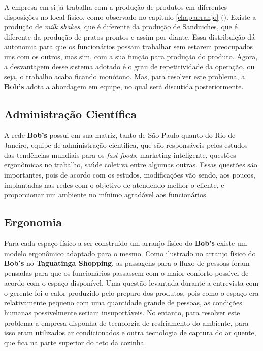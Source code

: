 			A empresa em si já trabalha com a produção de produtos em diferentes disposições no local físico, como observado no capitulo \ref{chap:arranjo} (). Existe a produção de \emph{milk shakes}, que é diferente da produção de Sanduiches, que é diferente da produção de pratos prontos e assim por diante. Essa distribuição dá autonomia para que os funcionários possam trabalhar sem estarem preocupados uns com os outros, mas sim, com a sua função para produção do produto. Agora, a desvantagem desse sistema adotado é o grau de repetitividade da operação, ou seja, o trabalho acaba ficando monótono. Mas, para resolver este problema, a \textbf{Bob’s} adota a abordagem em equipe, no qual será discutida posteriormente.

		\subsection[Administração Científica]{Administração Científica}
		\label{sec:organizacao_ac}

			A rede \textbf{Bob’s} possui em sua matriz, tanto de São Paulo quanto do Rio de Janeiro, equipe de administração cientifica, que são responsáveis pelos estudos das tendências mundiais para os \emph{fast foods}, marketing inteligente, questões ergonômicas no trabalho, saúde coletiva entre algumas outras. Essas questões são importantes, pois de acordo com os estudos, modificações vão sendo, aos poucos, implantadas nas redes com o objetivo de atendendo melhor o cliente, e proporcionar um ambiente no mínimo agradável aos funcionários. \cite{osman}

		\subsection[Ergonomia]{Ergonomia}
		\label{sec:organizacao_ergonomia}

			Para cada espaço físico a ser construído um arranjo físico do \textbf{Bob’s} existe um modelo ergonômico adaptado para o mesmo. Como ilustrado no arranjo físico do \textbf{Bob’s} no \textbf{Taguatinga Shopping}, as passagens para o fluxo de pessoas foram pensadas para que os funcionários passassem com o maior conforto possível de acordo com o espaço disponível. Uma questão levantada durante a entrevista com o gerente foi o calor produzido pelo preparo dos produtos, pois como o espaço era relativamente pequeno com uma quantidade grande de pessoas, as condições humanas possivelmente seriam insuportáveis. No entanto, para resolver este problema a empresa disponha de tecnologia de resfriamento do ambiente, para isso eram utilizados ar condicionados e outra tecnologia de captura do ar quente, que fica na parte superior do teto da cozinha.


